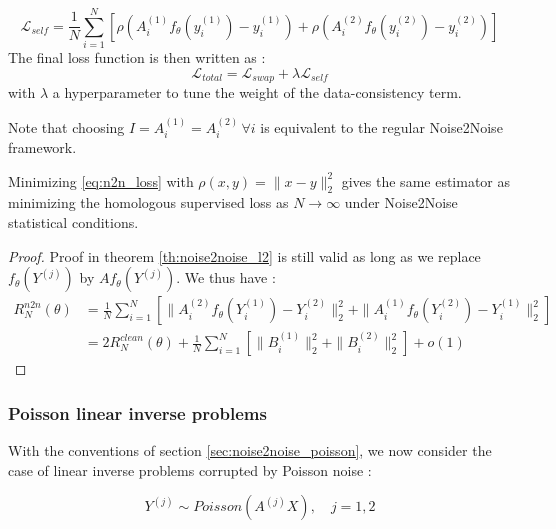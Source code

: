 \begin{equation*}
    \mathcal{L}_{self} = \frac{1}{N} \sum_{i=1}^N \left[ \rho(A_i^{(1)} f_{\theta}(y_i^{(1)}) - y_i^{(1)}) + \rho(A_i^{(2)} f_{\theta}(y_i^{(2)}) - y_i^{(2)}) \right]
\end{equation*}
The final loss function is then written as :
\begin{equation}
    \mathcal{L}_{total} = \mathcal{L}_{swap} + \lambda \mathcal{L}_{self}
\end{equation}
with $\lambda$ a hyperparameter to tune the weight of the data-consistency term.

\begin{remark}
    Note that choosing $I = A_i^{(1)} = A_i^{(2)} \, \forall i$ is equivalent to the regular Noise2Noise framework.
\end{remark}

\begin{theorem}
    Minimizing \ref{eq:n2n_loss} with $\rho(x, y) = \| x - y \|_2^2$ gives the same estimator as minimizing the homologous supervised loss as $N \to \infty$ under Noise2Noise statistical conditions.
\end{theorem}

\begin{proof}
    Proof in theorem \ref{th:noise2noise_l2} is still valid as long as we replace $f_{\theta}(Y^{(j)})$ by $Af_{\theta}(Y^{(j)})$. We thus have :
    \begin{align*}
        R_{N}^{n2n}(\theta) &= \frac{1}{N} \sum_{i=1}^N \left[ \| A_i^{(2)} f_{\theta}(Y_i^{(1)}) - Y_i^{(2)} \|_2^2 + \| A_i^{(1)} f_{\theta}(Y_i^{(2)}) - Y_i^{(1)} \|_2^2 \right] \\
        &= 2 R_{N}^{clean}(\theta) + \frac{1}{N} \sum_{i=1}^N \left[ \| B_i^{(1)} \|_2^2 + \| B_i^{(2)} \|_2^2 \right] + o(1)
    \end{align*}
\end{proof}

\subsubsection{Poisson linear inverse problems}

With the conventions of section \ref{sec:noise2noise_poisson}, we now consider the case of linear inverse problems corrupted by Poisson noise :

\begin{equation}
    Y^{(j)} \sim Poisson(A^{(j)} X), \quad j = 1, 2
\end{equation}

